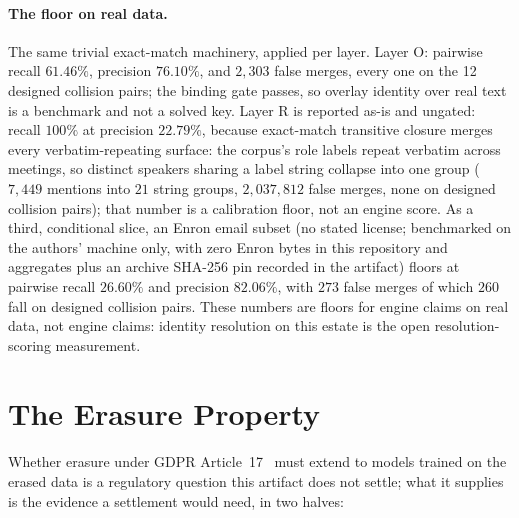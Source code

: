 \documentclass{article}
\begin{document}
\paragraph{The floor on real data.}
The same trivial exact-match machinery, applied per layer. Layer O: pairwise recall $61.46\%$, precision $76.10\%$, and $2{,}303$ false merges, every one on the 12 designed collision pairs; the binding gate passes, so overlay identity over real text is a benchmark and not a solved key. Layer R is reported as-is and ungated: recall $100\%$ at precision $22.79\%$, because exact-match transitive closure merges every verbatim-repeating surface: the corpus's role labels repeat verbatim across meetings, so distinct speakers sharing a label string collapse into one group ($7{,}449$ mentions into $21$ string groups, $2{,}037{,}812$ false merges, none on designed collision pairs); that number is a calibration floor, not an engine score. As a third, conditional slice, an Enron email subset (no stated license; benchmarked on the authors' machine only, with zero Enron bytes in this repository and aggregates plus an archive SHA-256 pin recorded in the artifact) floors at pairwise recall $26.60\%$ and precision $82.06\%$, with $273$ false merges of which $260$ fall on designed collision pairs. These numbers are floors for engine claims on real data, not engine claims: identity resolution on this estate is the open resolution-scoring measurement.

\section{The Erasure Property}
\label{sec:erasure}

Whether erasure under GDPR Article~17~\cite{gdpr_art17} must extend to models trained on the erased data is a regulatory question this artifact does not settle; what it supplies is the evidence a settlement would need, in two halves:
\end{document}
